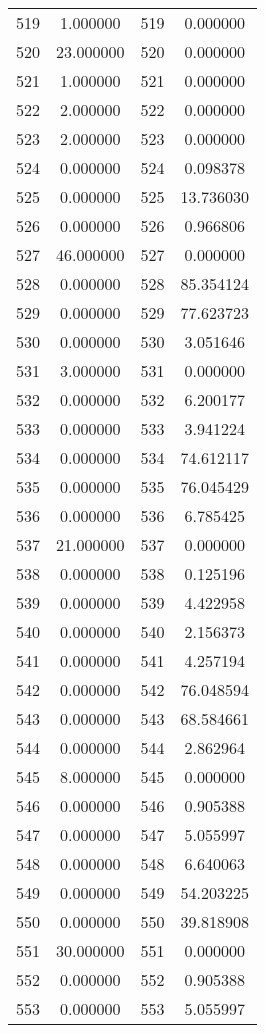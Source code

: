 \documentclass[12pt]{article}
\begin{document}
\begin{longtable}{@{}cccc@{}}
519 & 1.000000 & 519 & 0.000000 \\
520 & 23.000000 & 520 & 0.000000 \\
521 & 1.000000 & 521 & 0.000000 \\
522 & 2.000000 & 522 & 0.000000 \\
523 & 2.000000 & 523 & 0.000000 \\
524 & 0.000000 & 524 & 0.098378 \\
525 & 0.000000 & 525 & 13.736030 \\
526 & 0.000000 & 526 & 0.966806 \\
527 & 46.000000 & 527 & 0.000000 \\
528 & 0.000000 & 528 & 85.354124 \\
529 & 0.000000 & 529 & 77.623723 \\
530 & 0.000000 & 530 & 3.051646 \\
531 & 3.000000 & 531 & 0.000000 \\
532 & 0.000000 & 532 & 6.200177 \\
533 & 0.000000 & 533 & 3.941224 \\
534 & 0.000000 & 534 & 74.612117 \\
535 & 0.000000 & 535 & 76.045429 \\
536 & 0.000000 & 536 & 6.785425 \\
537 & 21.000000 & 537 & 0.000000 \\
538 & 0.000000 & 538 & 0.125196 \\
539 & 0.000000 & 539 & 4.422958 \\
540 & 0.000000 & 540 & 2.156373 \\
541 & 0.000000 & 541 & 4.257194 \\
542 & 0.000000 & 542 & 76.048594 \\
543 & 0.000000 & 543 & 68.584661 \\
544 & 0.000000 & 544 & 2.862964 \\
545 & 8.000000 & 545 & 0.000000 \\
546 & 0.000000 & 546 & 0.905388 \\
547 & 0.000000 & 547 & 5.055997 \\
548 & 0.000000 & 548 & 6.640063 \\
549 & 0.000000 & 549 & 54.203225 \\
550 & 0.000000 & 550 & 39.818908 \\
551 & 30.000000 & 551 & 0.000000 \\
552 & 0.000000 & 552 & 0.905388 \\
553 & 0.000000 & 553 & 5.055997 \\

\end{longtable}
\end{document}
